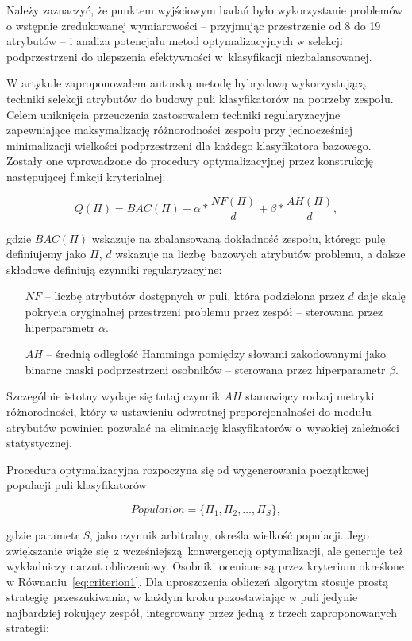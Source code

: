 Należy zaznaczyć, że punktem wyjściowym badań było wykorzystanie problemów o wstępnie zredukowanej wymiarowości -- przyjmując przestrzenie od 8 do 19 atrybutów -- i analiza potencjału metod optymalizacyjnych w selekcji podprzestrzeni do ulepszenia efektywności w~klasyfikacji niezbalansowanej.

W artykule zaproponowałem autorską metodę hybrydową wykorzystującą techniki selekcji atrybutów do budowy puli klasyfikatorów na potrzeby zespołu. Celem uniknięcia przeuczenia zastosowałem techniki regularyzacyjne zapewniające maksymalizację różnorodności zespołu przy jednocześniej minimalizacji wielkości podprzestrzeni dla każdego klasyfikatora bazowego. Zostały one wprowadzone do procedury optymalizacyjnej przez konstrukcję następującej funkcji kryterialnej:

\begin{equation}
	Q(\Pi) = BAC(\Pi)- \alpha * \frac{NF(\Pi)}{d}+ \beta * \frac{AH(\Pi)}{d},\label{eq:criterion1}
\end{equation}

\noindent gdzie $BAC(\Pi)$ wskazuje na zbalansowaną dokładność zespołu, którego pulę definiujemy jako $\Pi$, $d$ wskazuje na liczbę bazowych atrybutów problemu, a dalsze składowe definiują czynniki regularyzacyjne:

\begin{itemize}
	\item[$NF$] -- liczbę atrybutów dostępnych w puli, która podzielona przez $d$ daje skalę pokrycia oryginalnej przestrzeni problemu przez zespół -- sterowana przez hiperparametr $\alpha$.
	\item[$AH$] -- średnią odległość Hamminga pomiędzy słowami zakodowanymi jako binarne maski podprzestrzeni osobników -- sterowana przez hiperparametr $\beta$.
\end{itemize}

Szczególnie istotny wydaje się tutaj czynnik $AH$ stanowiący rodzaj metryki różnorodności, który w ustawieniu odwrotnej proporcjonalności do modułu atrybutów powinien pozwalać na eliminację klasyfikatorów o~wysokiej zależności statystycznej. 

Procedura optymalizacyjna rozpoczyna się od wygenerowania początkowej populacji puli klasyfikatorów

\begin{equation}
	Population = \{\Pi_1, \Pi_2, \ldots, \Pi_S\},
\end{equation}

\noindent gdzie parametr $S$, jako czynnik arbitralny, określa wielkość populacji. Jego zwiększanie wiąże się z wcześniejszą konwergencją optymalizacji, ale generuje też wykładniczy narzut obliczeniowy. Osobniki oceniane są przez kryterium określone w Równaniu~\ref{eq:criterion1}. Dla uproszczenia obliczeń algorytm stosuje prostą strategię przeszukiwania, w każdym kroku pozostawiając w puli jedynie najbardziej rokujący zespół, integrowany przez jedną z trzech zaproponowanych strategii:

